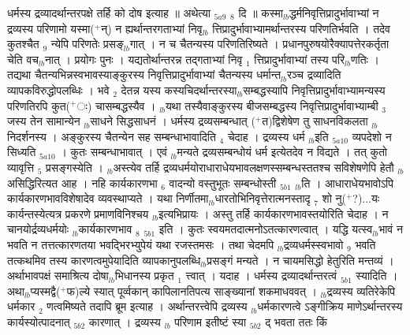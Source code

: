 \documentclass[article,12pt,a4paper]{memoir}%
\newcommand{\add}[1]{($^{+}$#1)}
\begin{document}
	  
	  \pstart \leavevmode%
	\hphantom{.}धर्मस्य द्रव्यादर्थान्तरपक्षे तर्हि को दोष इत्याह ॥ {\color{DodgerBlue3}अथेत्या} {\tiny $_{5a9}$} {\tiny $_{8}$} दि ॥ कस्मा{\tiny $_{lb}$}द्धर्मनिवृत्तिप्रादुर्भावाभ्यां न द्रव्यस्य परिणामो यस्मा\add{न्} न ह्यर्थान्तरगताभ्यां निवृ{\tiny $_{lb}$} \leavevmode{} त्तिप्रादुर्भावाभ्यामर्थान्तरस्य परिणतिर्भवति । तदेव कुतश्चैत {\tiny $_{9}$} \leavevmode{} न्येपि परिणतेः प्रसङ्{\tiny $_{lb}$}गात् । न च चैतन्यस्य परिणतिरिष्यते । प्रधानपुरुषयोरैक्यापत्तेरकर्तृता चेति वच{\tiny $_{lb}$}नात् । प्रयोगः पुनः । यद्यतोर्थान्तरन्न तद्गताभ्यां निवृ {\tiny $_{1}$} त्तिप्रादुर्भावाभ्यां तस्य परि{\tiny $_{lb}$}णतिः । तद्यथा चैतन्यभिन्नस्वभावस्याङ्कुरस्य निवृत्तिप्रादुर्भावाभ्यां चैतन्यस्य धर्मान्त{\tiny $_{lb}$}रञ्च द्रव्यादिति व्यापकविरुद्धोपलब्धिः । भवे {\tiny $_{2}$} देतन्न यस्य कस्यचिदर्थान्तरस्या{\tiny $_{lb}$}सम्बद्धस्यापि निवृत्तिप्रादुर्भावाभ्यामन्यस्य परिणतिरपि कुत\add{ः} चासम्बद्धस्यैव । {\tiny $_{lb}$}यथा तस्यैवाङ्कुरस्य बीजसम्बद्धस्य निवृत्तिप्रादुर्भावाभ्याम्बी {\tiny $_{3}$} जस्य तेन सामान्येन {\tiny $_{lb}$}साधने सिद्धसाधनं । धर्मस्य द्रव्यसम्बन्धात् \add{त}द्विशेषेण तु साधनविकलता {\tiny $_{lb}$}निदर्शनस्य । अङ्कुरस्य चैतन्येन सह सम्बन्धाभावादिति {\tiny $_{4}$} चेदाह । {\color{DodgerBlue3}द्रव्यस्य धर्म {\tiny $_{lb}$}इति {\tiny $_{5a10}$} व्यपदेशो न सिध्यति} {\tiny $_{5a10}$} । कुतः सम्बन्धाभावात् । एवं {\tiny $_{lb}$}मन्यते द्रव्यसम्बन्धोयं धर्म इत्येतदेव न विद्यते । तत् कुतो व्यावृत्ति {\tiny $_{5}$} प्रसङ्गस्येति । {\tiny $_{lb}$}अस्त्येव तर्हि द्रव्यधर्मयोराधाराधेयभावलक्षणस्सम्बन्धस्ततश्च सविशेषणेपि हेतौ {\tiny $_{lb}$}असिद्धिरित्यत आह । {\color{DodgerBlue3}नहि कार्यकारणभा {\tiny $_{6}$} वादन्यो वस्तुभूतः सम्बन्धोस्ती} {\tiny $_{5b1}$} {\tiny $_{lb}$}ति । आधाराधेयभावोऽपि कार्यकारणभावविशेषादेव व्यवस्थाप्यते । यथा निर्णीतमा{\tiny $_{lb}$}धारतोभिनिवृत्तेरात्मनस्तादृ {\tiny $_{7}$} शो नु\add{?}...यः कार्यन्तस्येत्यत्र प्रकरणे {\color{DodgerBlue3}प्रमाणविनिश्चय} {\tiny $_{lb}$}इत्यभिप्रायः । अस्तु तर्हि कार्यकारणभावस्तयोरिति चेदाह । {\color{DodgerBlue3}न चानयोर्द्रव्यधर्मयोः {\tiny $_{lb}$}कार्यकारणभाव {\tiny $_{8}$}} {\tiny $_{5b1}$} इति । कुतः स्वयमतदात्मनोऽतत्कारणत्वात् । यद्धि यत्स्व{\tiny $_{lb}$}भावं न भवति न तत्तत्कारणतया भवद्भिरभ्युपेयं यथा रजस्तमसः । तथा चेदमपि {\tiny $_{lb}$}द्रव्यधर्मस्स्वभावो {\tiny $_{9}$} \leavevmode{} भवति तत्कथमिव तस्य कारणत्वमुपेयादिति व्यापकानुपलब्धि{\tiny $_{lb}$}प्रसङ्गं मन्यते । न चायमसिद्धो हेतुरिति मन्तव्यं । अर्थाभावपक्षं समाश्रित्य दोषा{\tiny $_{lb}$}भिधानस्य प्रकृत {\tiny $_{1}$} त्त्वात् । यदाह । {\color{DodgerBlue3}धर्मस्य द्रव्यादर्थान्तरत्वं {\tiny $_{5b1}$} स्यादिति} । अथा{\tiny $_{lb}$}प्यस्मद्वै\add{फ}ल्ये स्यात् पूर्व्वकान् कापिलानतिपत्य साङ्ख्यानां शकमाधववत् । {\tiny $_{lb}$}द्रव्यस्य व्यतिरेकेपि धर्मकार {\tiny $_{2}$} णत्वमिष्यते तदापि ब्रूम इत्याह । {\color{DodgerBlue3}अर्थान्तरत्त्वेपि द्रव्यस्य {\tiny $_{lb}$}धर्मकारणत्वे} ऽङ्गीक्रिय {\color{DodgerBlue3}माणेऽर्थान्तरस्य कार्यस्योत्पादनात्} {\tiny $_{5b2}$} कारणात् । द्रव्यस्य {\tiny $_{lb}$} \leavevmode{} {\color{DodgerBlue3}परिणाम इतीष्टं स्या} {\tiny $_{5b2}$} द् भवता ततः किं 
\end{document}
